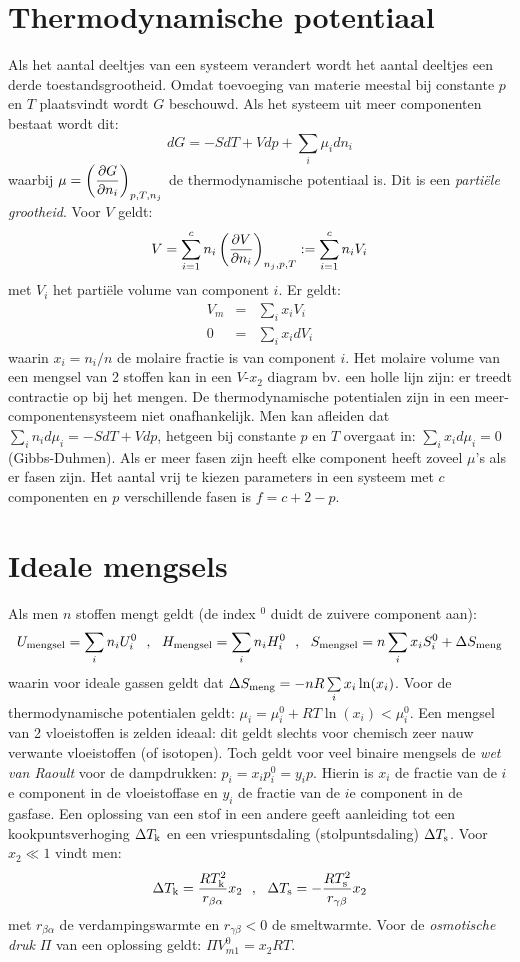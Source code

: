 \section{Thermodynamische potentiaal}
Als het aantal deeltjes van een systeem verandert wordt het aantal deeltjes
een derde toestandsgrootheid. Omdat toevoeging van materie meestal bij
constante $p$ en $T$ plaatsvindt wordt $G$ beschouwd. Als het systeem uit
meer componenten bestaat wordt dit:
\[
dG=-SdT+Vdp+\sum_i\mu_idn_i
\]
waarbij $\displaystyle \mu=\left(\frac{\partial G}{\partial n_i}\right)_{p,T,n_j}$ de thermodynamische
potentiaal is. Dit is een {\it parti\"ele grootheid}. Voor $V$ geldt:
\[
V=\sum_{i=1}^c n_i\left(\frac{\partial V}{\partial n_i}\right)_{n_j,p,T}:=\sum_{i=1}^c n_i V_i
\]
met $V_i$ het parti\"ele volume van component $i$. Er geldt:
\begin{eqnarray*}
V_m&=&\sum_i x_i V_i\\
0&=&\sum_i x_i dV_i
\end{eqnarray*}
waarin $x_i=n_i/n$ de molaire fractie is van component $i$. Het molaire volume
van een mengsel van 2 stoffen kan in een $V$-$x_2$ diagram bv. een holle
lijn zijn: er treedt contractie op bij het mengen.
\npar
De thermodynamische potentialen zijn in een meer-componentensysteem niet
onafhankelijk. Men kan afleiden dat
$\sum\limits_i n_i d\mu_i=-SdT+Vdp$, hetgeen bij constante $p$ en $T$ overgaat
in: $\sum\limits_i x_i d\mu_i=0$ (Gibbs-Duhmen).
\npar
Als er meer fasen zijn heeft elke component heeft zoveel $\mu$'s als er fasen
zijn. Het aantal vrij te kiezen parameters in een systeem met $c$ componenten
en $p$ verschillende fasen is $f=c+2-p$.

\section{Ideale mengsels}
Als men $n$ stoffen mengt geldt (de index $^0$ duidt de zuivere component aan):
\[
U_{\rm mengsel}=\sum_i n_i U^0_i~~,~~H_{\rm mengsel}=\sum_i n_i H^0_i~~,~~
S_{\rm mengsel}=n\sum_i x_i S^0_i+\Delta S_{\rm meng}
\]
waarin voor ideale gassen geldt dat
$\Delta S_{\rm meng}=-nR\sum\limits_i x_i\ln(x_i)$.
\npar
Voor de thermodynamische potentialen geldt: $\mu_i=\mu_i^0+RT\ln(x_i)<\mu_i^0$.
Een mengsel van 2 vloeistoffen is zelden ideaal: dit geldt slechts voor chemisch
zeer nauw verwante vloeistoffen (of isotopen). Toch geldt voor veel binaire
mengsels de {\it wet van Raoult} voor de dampdrukken: $p_i=x_ip^0_i=y_ip$.
Hierin is $x_i$ de fractie van de $i$e component in de vloeistoffase en $y_i$
de fractie van de $i$e component in de gasfase.
\npar
Een oplossing van een stof in een andere geeft aanleiding tot een
kookpuntsverhoging $\Delta T_{\rm k}$ en een vriespuntsdaling
(stolpuntsdaling) $\Delta T_{\rm s}$. Voor $x_2\ll1$
vindt men:
\[
\Delta T_{\rm k}=\frac{RT_{\rm k}^2}{r_{\beta\alpha}}x_2~~,~~
\Delta T_{\rm s}=-\frac{RT_{\rm s}^2}{r_{\gamma\beta}}x_2
\]
met $r_{\beta\alpha}$ de verdampingswarmte en $r_{\gamma\beta}<0$ de
smeltwarmte. Voor de {\it osmotische druk} $\Pi$ van een oplossing geldt:
$\Pi V_{m1}^0=x_2RT$.

